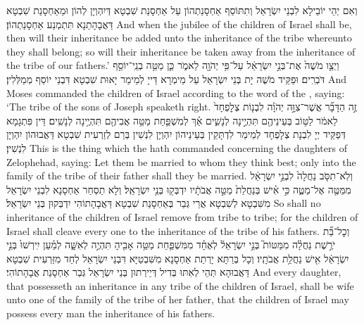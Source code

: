 {וְאִם יְהֵי יוֹבֵילָא לִבְנֵי יִשְׂרָאֵל וְתִתּוֹסַף אַחְסָנַתְהוֹן עַל אַחְסָנַת שִׁבְטָא דְּיִהְוְיָן לְהוֹן וּמֵאַחְסָנַת שִׁבְטָא דַּאֲבָהָתַנָא תִּתְמְנַע אַחְסָנַתְהוֹן׃}
{And when the jubilee of the children of Israel shall be, then will their inheritance be added unto the inheritance of the tribe whereunto they shall belong; so will their inheritance be taken away from the inheritance of the tribe of our fathers.’}{}
{וַיְצַ֤ו מֹשֶׁה֙ אֶת־בְּנֵ֣י יִשְׂרָאֵ֔ל עַל־פִּ֥י יְהֹוָ֖ה לֵאמֹ֑ר כֵּ֛ן מַטֵּ֥ה בְנֵֽי־יוֹסֵ֖ף דֹּבְרִֽים׃}
{וּפַקֵּיד מֹשֶׁה יָת בְּנֵי יִשְׂרָאֵל עַל מֵימְרָא דַּייָ לְמֵימַר יָאוּת שִׁבְטָא דִּבְנֵי יוֹסֵף מְמַלְּלִין׃}
{And Moses commanded the children of Israel according to the word of the \lord, saying: ‘The tribe of the sons of Joseph speaketh right.}{}
{זֶ֣ה הַדָּבָ֞ר אֲשֶׁר־צִוָּ֣ה יְהֹוָ֗ה לִבְנ֤וֹת צְלׇפְחָד֙ לֵאמֹ֔ר לַטּ֥וֹב בְּעֵינֵיהֶ֖ם תִּהְיֶ֣ינָה לְנָשִׁ֑ים אַ֗ךְ לְמִשְׁפַּ֛חַת מַטֵּ֥ה אֲבִיהֶ֖ם תִּהְיֶ֥ינָה לְנָשִֽׁים׃}
{דֵּין פִּתְגָמָא דְּפַקֵּיד יְיָ לִבְנָת צְלָפְחָד לְמֵימַר לִדְתָּקֵין בְּעֵינֵיהוֹן יִהְוְיָן לִנְשִׁין בְּרַם לְזַרְעִית שִׁבְטָא דַּאֲבוּהוֹן יִהְוְיָן לִנְשִׁין׃}
{This is the thing which the \lord\space hath commanded concerning the daughters of Zelophehad, saying: Let them be married to whom they think best; only into the family of the tribe of their father shall they be married.}{}
{וְלֹֽא־תִסֹּ֤ב נַחֲלָה֙ לִבְנֵ֣י יִשְׂרָאֵ֔ל מִמַּטֶּ֖ה אֶל־מַטֶּ֑ה כִּ֣י אִ֗ישׁ בְּנַחֲלַת֙ מַטֵּ֣ה אֲבֹתָ֔יו יִדְבְּק֖וּ בְּנֵ֥י יִשְׂרָאֵֽל׃}
{וְלָא תַסְחַר אַחְסָנָא לִבְנֵי יִשְׂרָאֵל מִשִּׁבְטָא לְשִׁבְטָא אֲרֵי גְּבַר בְּאַחְסָנַת שִׁבְטָא דַּאֲבָהָתוֹהִי יִדְבְּקוּן בְּנֵי יִשְׂרָאֵל׃}
{So shall no inheritance of the children of Israel remove from tribe to tribe; for the children of Israel shall cleave every one to the inheritance of the tribe of his fathers.}{}
{וְכׇל־בַּ֞ת יֹרֶ֣שֶׁת נַחֲלָ֗ה מִמַּטּוֹת֮ בְּנֵ֣י יִשְׂרָאֵל֒ לְאֶחָ֗ד מִמִּשְׁפַּ֛חַת מַטֵּ֥ה אָבִ֖יהָ תִּהְיֶ֣ה לְאִשָּׁ֑ה לְמַ֗עַן יִֽירְשׁוּ֙ בְּנֵ֣י יִשְׂרָאֵ֔ל אִ֖ישׁ נַחֲלַ֥ת אֲבֹתָֽיו׃
}
{וְכָל בְּרַתָּא יָרְתַת אַחְסָנָא מִשִּׁבְטַיָּא דִּבְנֵי יִשְׂרָאֵל לְחַד מִזַּרְעִית שִׁבְטָא דַּאֲבוּהָא תְּהֵי לְאִתּוּ בְּדִיל דְּיֵירְתוּן בְּנֵי יִשְׂרָאֵל גְּבַר אַחְסָנַת אֲבָהָתוֹהִי׃}
{And every daughter, that possesseth an inheritance in any tribe of the children of Israel, shall be wife unto one of the family of the tribe of her father, that the children of Israel may possess every man the inheritance of his fathers.}{}
